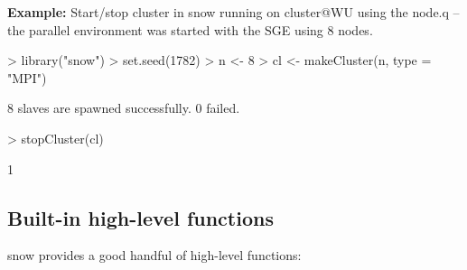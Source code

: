 \textbf{Example:} Start/stop cluster in snow \newline
running on cluster@WU using the node.q -- the parallel environment was
started with the SGE using 8 nodes.

\begin{Schunk}
\begin{Sinput}
> library("snow")
> set.seed(1782)
> n <- 8
> cl <- makeCluster(n, type = "MPI")
\end{Sinput}
\begin{Soutput}
	8 slaves are spawned successfully. 0 failed.
\end{Soutput}
\begin{Sinput}
> stopCluster(cl)
\end{Sinput}
\begin{Soutput}
[1] 1
\end{Soutput}
\end{Schunk}


\subsection{Built-in high-level functions}

snow provides a good handful of high-level functions: 


